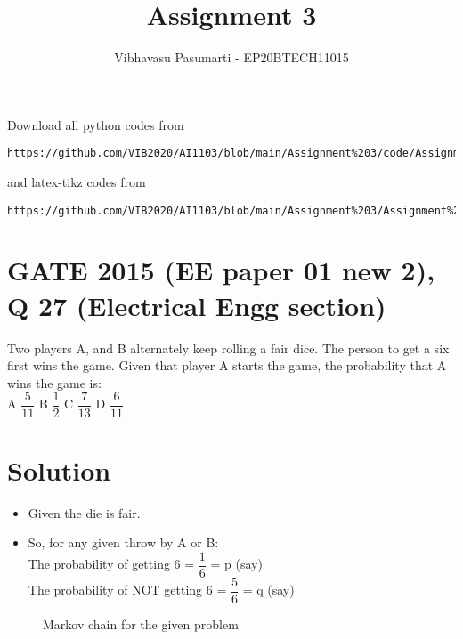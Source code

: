 \documentclass[journal,12pt,twocolumn]{IEEEtran}
\theoremstyle{definition}
\numberwithin{equation}{subsection}
\renewcommand{\thefigure}{\theproblem}
\begin{document}
\title{Assignment 3}
\author{Vibhavasu Pasumarti - EP20BTECH11015}
\maketitle
\newpage
\bigskip
\renewcommand{\thefigure}{\theenumi}
\renewcommand{\thetable}{\theenumi}
Download all python codes from 
\begin{lstlisting}
https://github.com/VIB2020/AI1103/blob/main/Assignment%203/code/Assignment%203.py
\end{lstlisting}
and latex-tikz codes from 
\begin{lstlisting}
https://github.com/VIB2020/AI1103/blob/main/Assignment%203/Assignment%203.pdf
\end{lstlisting}
\section{\large GATE 2015 (EE paper 01 new 2), Q 27 (Electrical Engg section)}
Two players A, and B alternately keep rolling a fair dice. The person to get a six first wins the game. Given that player A starts the game, the probability that A wins the game is:\\[5pt]
    A $\dfrac{5}{11}$ \hspace{1cm}
    B $\dfrac{1}{2}$ \hspace{1cm}
    C $\dfrac{7}{13}$ \hspace{1cm}
    D $\dfrac{6}{11}$ \hspace{1cm}
\section{\Large Solution}
\begin{itemize}
    \item Given the die is fair.
    \item So, for any given throw by A or B:\\
    The probability of getting 6 = $\dfrac{1}{6}$ = p (say)\\
    The probability of NOT getting 6 = $\dfrac{5}{6}$ = q (say)
\end{itemize}
\begin{figure}[h]
    \centering
        \caption{Markov chain for the given problem}
        \label{fig:my_label}
\end{figure}
    
\end{document}
